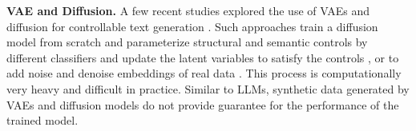 \textbf{VAE and Diffusion.} A few recent studies explored the use of VAEs and diffusion for %
controllable text generation \cite{li2022diffusion,gong2022diffuseq,zhou2024difflm}. Such approaches train a diffusion model from scratch and parameterize structural and semantic controls by different classifiers and update the latent variables to satisfy the controls \cite{li2021data}, or to add noise and denoise embeddings of real data \cite{zhao2020dataset}. This process is computationally very heavy and difficult in practice.
%
Similar to LLMs, synthetic data generated by VAEs and diffusion models do not provide guarantee for the performance of the trained model. %


%
%

%
%
%
%
%

%

%